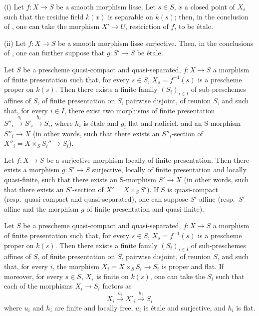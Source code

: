 \begin{corollary}[17.16.3]
\label{IV.17.16.3}
(i) Let $f:X\to S$ be a smooth morphism lisse.
Let $s\in S$, $x$ a closed point of $X_s$ such that the residue field $k(x)$ is separable on $k(s)$; then, in the conclusion of , one can take the morphism $X'\to U$, restriction of $f$, to be \'etale.

(ii)
Let $f:X\to S$ be a smooth morphism lisse surjective.
Then, in the conclusions of , one can further suppose that $g:S'\to S$ be \'etale.
\end{corollary}

\begin{proposition}[17.16.4]
\label{IV.17.16.4}
Let $S$ be a prescheme quasi-compact and quasi-separated, $f:X\to S$ a morphism of finite presentation such that, for every $s\in S$, $X_s=f^{-1}(s)$ is a prescheme proper on $k(s)$.
Then there exists a finite family $(S_i)_{i\in I}$ of sub-preschemes affines of $S$, of finite presentation on $S$, pairwise disjoint, of reunion $S$, and such that, for every $i\in I$, there exist two morphisms of finite presentation $S''_i\xrightarrow{g_i} S'_i\xrightarrow{h_i}S_i$, where $h_i$ is \'etale and $g_i$ flat and radiciel, and an S-morphism $S''_i\to X$ (in other words, such that there exists an $S''_i$-section of $X''_i=X\times_S S_i''\to S_i$).
\end{proposition}

\begin{corollary}[17.16.5]
\label{IV.17.16.5}
Let $f:X\to S$ be a surjective morphism locally of finite presentation.
Then there exists a morphism $g:S'\to S$ surjective, locally of finite presentation and locally quasi-finite, such that there exists an S-morphism $S'\to X$ (in other words, such that there exists an $S'$-section of $X'=X\times_S S'$).
If $S$ is quasi-compact (resp.\ quasi-compact and quasi-separated), one can suppose $S'$ affine (resp.\ $S'$ affine and the morphism $g$ of finite presentation and quasi-finite).
\end{corollary}

\begin{proposition}[17.16.6]
\label{IV.17.16.6}
Let $S$ be a prescheme quasi-compact and quasi-separated, $f:X\to S$ a morphism of finite presentation such that, for every $s\in S$, $X_s=f^{-1}(s)$ is a prescheme proper on $k(s)$.
Then there exists a finite family $(S_i)_{i\in I}$ of sub-preschemes affines of $S$, of finite presentation on $S$, pairwise disjoint, of reunion $S$, and such that, for every $i$, the morphism $X_i=X\times_S S_i\to S_i$ is proper and flat.
If moreover, for every $s\in S$, $X_s$ is finite on $k(s)$, one can take the $S_i$ such that each of the morphisms $X_i\to S_i$ factors as
\[
X_i \xrightarrow{u_i} X'_i \xrightarrow{h_i} S_i
\]
where $u_i$ and $h_i$ are finite and locally free, $u_i$ is \'etale and surjective, and $h_i$ is flat.
\end{proposition}
